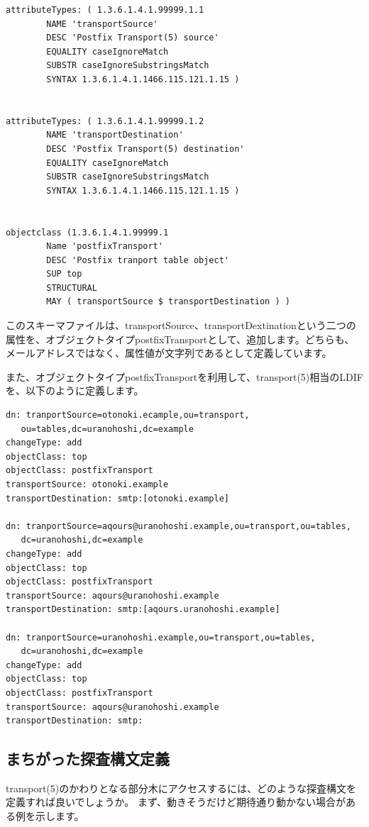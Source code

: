 \begin{verbatim}
attributeTypes: ( 1.3.6.1.4.1.99999.1.1
        NAME 'transportSource'
        DESC 'Postfix Transport(5) source'
        EQUALITY caseIgnoreMatch
        SUBSTR caseIgnoreSubstringsMatch
        SYNTAX 1.3.6.1.4.1.1466.115.121.1.15 )


attributeTypes: ( 1.3.6.1.4.1.99999.1.2
        NAME 'transportDestination'
        DESC 'Postfix Transport(5) destination'
        EQUALITY caseIgnoreMatch
        SUBSTR caseIgnoreSubstringsMatch
        SYNTAX 1.3.6.1.4.1.1466.115.121.1.15 )


objectclass (1.3.6.1.4.1.99999.1
        Name 'postfixTransport'
        DESC 'Postfix tranport table object'
        SUP top
        STRUCTURAL
        MAY ( transportSource $ transportDestination ) )
\end{verbatim}

このスキーマファイルは、transportSource、transportDextinationという二つの属性を、オブジェクトタイプpostfixTransportとして、追加します。どちらも、メールアドレスではなく、属性値が文字列であるとして定義しています。

また、オブジェクトタイプpostfixTransportを利用して、transport(5)相当のLDIFを、以下のように定義します。

\begin{verbatim}
dn: tranportSource=otonoki.ecample,ou=transport,
   ou=tables,dc=uranohoshi,dc=example
changeType: add
objectClass: top
objectClass: postfixTransport
transportSource: otonoki.example
transportDestination: smtp:[otonoki.example]

dn: tranportSource=aqours@uranohoshi.example,ou=transport,ou=tables,
   dc=uranohoshi,dc=example
changeType: add
objectClass: top
objectClass: postfixTransport
transportSource: aqours@uranohoshi.example
transportDestination: smtp:[aqours.uranohoshi.example]

dn: tranportSource=uranohoshi.example,ou=transport,ou=tables,
   dc=uranohoshi,dc=example
changeType: add
objectClass: top
objectClass: postfixTransport
transportSource: aqours@uranohoshi.example
transportDestination: smtp:

\end{verbatim}

\subsection{まちがった探査構文定義}

transport(5)のかわりとなる部分木にアクセスするには、どのような探査構文を定義すれば良いでしょうか。
まず、動きそうだけど期待通り動かない場合がある例を示します。

